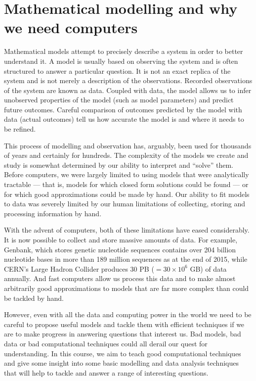 \section{Mathematical modelling and why we need computers}
\label{sec:why}
Mathematical models attempt to precisely describe a system in order to better understand it.  A model is usually based on observing the system and is often structured to answer a particular question. It is not an exact replica of the system and is not merely a description of the observations.  Recorded observations of the system are known as data.   Coupled with data, the model allows us to infer unobserved properties of the model (such as model parameters) and predict future outcomes.  Careful comparison of outcomes predicted by the model with data (actual outcomes) tell us how accurate the model is and where it needs to be refined.


This process of modelling and observation has, arguably, been used for thousands of years and certainly for hundreds.  The complexity of the models we create and study is somewhat determined by our ability to interpret and ``solve'' them.  Before computers, we were largely limited to using models that were analytically tractable --- that is, models for which closed form  solutions could be found  --- or for which good approximations could be made by hand.  Our ability to fit models to data was severely  limited by our human limitations of collecting, storing and processing information by hand.  

With the advent of computers, both of these limitations have eased considerably.  It is now possible to collect and store massive amounts of data.  For example, Genbank, which stores genetic nucleotide sequences  contains over 204 billion nucleotide bases in more than 189 million sequences as at the end of 2015, while CERN's Large Hadron Collider produces 30 PB ($=30 \times 10^6$ GB) of data annually.  And fast computers allow us process this data and  to make  almost  arbitrarily good approximations to models that are far more complex than could be tackled by hand.  

However, even with all the data and computing power in the world we need to be careful to propose useful models  and tackle them with efficient techniques if we are to make progress in answering questions that interest us.  Bad models, bad data or bad computational techniques could all derail our quest for understanding.  In this course, we aim to teach good computational techniques and give some insight into some basic modelling and data analysis techniques that will help to tackle and answer a range of interesting questions.


